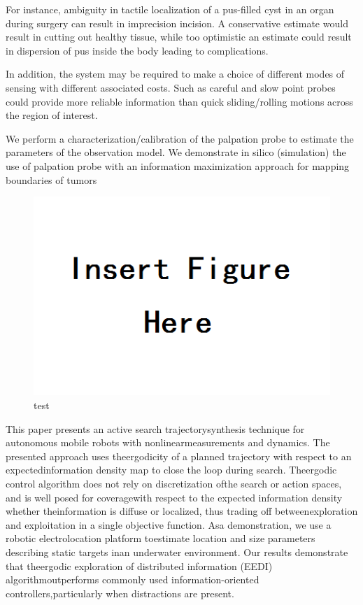 \documentclass[letterpaper, 10 pt, conference]{ieeeconf}
\begin{document}
For instance, ambiguity in tactile localization of a pus-filled cyst in an organ during surgery can result in imprecision incision. A conservative estimate would result in cutting out healthy tissue, while too optimistic an estimate could result in dispersion of pus inside the body leading to complications. 

In addition, the system may be required to make a choice of different modes of sensing with different associated costs. Such as careful and slow point probes could provide more reliable information than quick sliding/rolling motions across the region of interest. 

We perform a characterization/calibration of the palpation probe to estimate the parameters of the observation model. We demonstrate in silico (simulation) the use of palpation probe with an information maximization approach for mapping boundaries of tumors 

\begin{figure}[t]
\centering
\includegraphics[width=\linewidth]{figures/insert}
\caption{test}
\label{fig:intro}
\vspace{-15pt}
\end{figure}

This paper presents an active search trajectorysynthesis technique for autonomous mobile robots with nonlinearmeasurements and dynamics. The presented approach uses theergodicity of a planned trajectory with respect to an expectedinformation density map to close the loop during search. Theergodic control algorithm does not rely on discretization ofthe search or action spaces, and is well posed for coveragewith respect to the expected information density whether theinformation is diffuse or localized, thus trading off betweenexploration and exploitation in a single objective function. Asa demonstration, we use a robotic electrolocation platform toestimate location and size parameters describing static targets inan underwater environment. Our results demonstrate that theergodic exploration of distributed information (EEDI) algorithmoutperforms commonly used information-oriented controllers,particularly when distractions are present.
\end{document}
